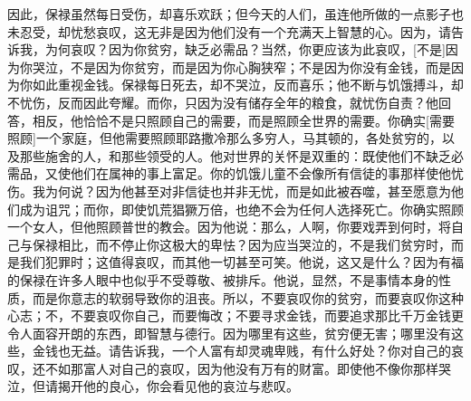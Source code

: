 因此，保禄虽然每日受伤，却喜乐欢跃；但今天的人们，虽连他所做的一点影子也未忍受，却忧愁哀叹，这无非是因为他们没有一个充满天上智慧的心。因为，请告诉我，为何哀叹？因为你贫穷，缺乏必需品？当然，你更应该为此哀叹，[不是]因为你哭泣，不是因为你贫穷，而是因为你心胸狭窄；不是因为你没有金钱，而是因为你如此重视金钱。保禄每日死去，却不哭泣，反而喜乐；他不断与饥饿搏斗，却不忧伤，反而因此夸耀。而你，只因为没有储存全年的粮食，就忧伤自责？他回答，相反，他恰恰不是只照顾自己的需要，而是照顾全世界的需要。你确实[需要照顾]一个家庭，但他需要照顾耶路撒冷那么多穷人，马其顿的，各处贫穷的，以及那些施舍的人，和那些领受的人。他对世界的关怀是双重的：既使他们不缺乏必需品，又使他们在属神的事上富足。你的饥饿儿童不会像所有信徒的事那样使他忧伤。我为何说？因为他甚至对非信徒也并非无忧，而是如此被吞噬，甚至愿意为他们成为诅咒；而你，即使饥荒猖獗万倍，也绝不会为任何人选择死亡。你确实照顾一个女人，但他照顾普世的教会。因为他说：那么，人啊，你要戏弄到何时，将自己与保禄相比，而不停止你这极大的卑怯？因为应当哭泣的，不是我们贫穷时，而是我们犯罪时；这值得哀叹，而其他一切甚至可笑。他说，这又是什么？因为有福的保禄在许多人眼中也似乎不受尊敬、被排斥。他说，显然，不是事情本身的性质，而是你意志的软弱导致你的沮丧。所以，不要哀叹你的贫穷，而要哀叹你这种心志；不，不要哀叹你自己，而要悔改；不要寻求金钱，而要追求那比千万金钱更令人面容开朗的东西，即智慧与德行。因为哪里有这些，贫穷便无害；哪里没有这些，金钱也无益。请告诉我，一个人富有却灵魂卑贱，有什么好处？你对自己的哀叹，还不如那富人对自己的哀叹，因为他没有万有的财富。即使他不像你那样哭泣，但请揭开他的良心，你会看见他的哀泣与悲叹。\par

